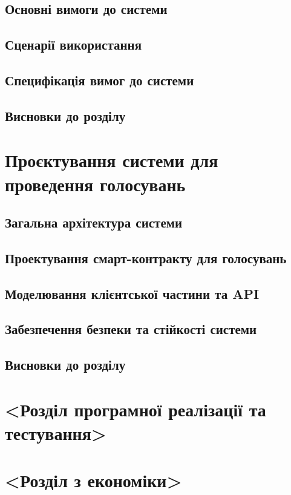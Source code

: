 \documentclass[14pt]{extreport}
\begin{document}
  \section{Основні вимоги до системи}
  \section{Сценарії використання}
  \section{Специфікація вимог до системи}
  \section{Висновки до розділу}

  \chapter{Проєктування системи для проведення голосувань}

  \section{Загальна архітектура системи}
  \section{Проектування смарт-контракту для голосувань}
  \section{Моделювання клієнтської частини та API}
  \section{Забезпечення безпеки та стійкості системи}
  \section{Висновки до розділу}
  
  \chapter{<Розділ програмної реалізації та тестування>}
  
  \chapter{<Розділ з економіки>}
  
\end{document}
